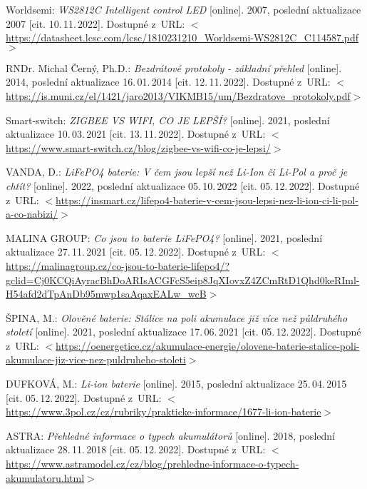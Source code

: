 \begin{thebibliography}{99}
    Worldsemi:
    \emph{WS2812C Intelligent control LED}\/ [online].
    2007, poslední aktualizace 2007 [cit. 10.\,11.\,2022].
    Dostupné z~URL: 
    \(<\)\url{https://datasheet.lcsc.com/lcsc/1810231210_Worldsemi-WS2812C_C114587.pdf}\(>\)

    RNDr. Michal Černý, Ph.D.:
    \emph{Bezdrátové protokoly - základní přehled}\/ [online].
    2014, poslední aktualizace 16.\,01.\,2014 [cit. 12.\,11.\,2022].
    Dostupné z~URL: 
    \(<\)\url{https://is.muni.cz/el/1421/jaro2013/VIKMB15/um/Bezdratove_protokoly.pdf}\(>\)

    Smart-switch:
    \emph{ZIGBEE VS WIFI, CO JE LEPŠÍ?}\/ [online].
    2021, poslední aktualizace 10.\,03.\,2021 [cit. 13.\,11.\,2022].
    Dostupné z~URL: 
    \(<\)\url{https://www.smart-switch.cz/blog/zigbee-vs-wifi-co-je-lepsi/}\(>\)

    VANDA, D.:
    \emph{LiFePO4 baterie: V čem jsou lepší než Li-Ion či Li-Pol a proč je chtít?}\/ [online].
    2022, poslední aktualizace 05.\,10.\,2022 [cit. 05.\,12.\,2022].
    Dostupné z~URL:
    \(<\)\url{https://insmart.cz/lifepo4-baterie-v-cem-jsou-lepsi-nez-li-ion-ci-li-pol-a-co-nabizi/}\(>\)

    MALINA GROUP:
    \emph{Co jsou to baterie LiFePO4?}\/ [online].
    2021, poslední aktualizace 27.\,11.\,2021 [cit. 05.\,12.\,2022].
    Dostupné z~URL:
    \(<\)\url{https://malinagroup.cz/co-jsou-to-baterie-lifepo4/?gclid=Cj0KCQiAyracBhDoARIsACGFcS5eip8JqXIovxZ4ZCmRtD1Qhd0keRIml-H54afd2dTpAnDb95mwp1saAqaxEALw_wcB}\(>\)

    ŠPINA, M.:
    \emph{Olověné baterie: Stálice na poli akumulace již více než půldruhého století}\/ [online].
    2021, poslední aktualizace 17.\,06.\,2021 [cit. 05.\,12.\,2022].
    Dostupné z~URL:
    \(<\)\url{https://oenergetice.cz/akumulace-energie/olovene-baterie-stalice-poli-akumulace-jiz-vice-nez-puldruheho-stoleti}\(>\)

    DUFKOVÁ, M.:
    \emph{Li-ion baterie}\/ [online].
    2015, poslední aktualizace 25.\,04.\,2015 [cit. 05.\,12.\,2022].
    Dostupné z~URL:
    \(<\)\url{https://www.3pol.cz/cz/rubriky/prakticke-informace/1677-li-ion-baterie}\(>\)

    ASTRA:
    \emph{Přehledné informace o typech akumulátorů}\/ [online].
    2018, poslední aktualizace 28.\,11.\,2018 [cit. 05.\,12.\,2022].
    Dostupné z~URL:
    \(<\)\url{https://www.astramodel.cz/cz/blog/prehledne-informace-o-typech-akumulatoru.html}\(>\)


\end{thebibliography}
